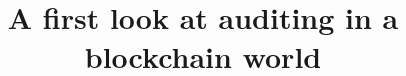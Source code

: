 \documentclass[envcountsect]{llncs}
\begin{document}
\frontmatter
\mainmatter

\title{\Large \bf A first look at auditing in a blockchain world}
\author{}
\institute{}
%

\maketitle












\clearpage
\appendix
\end{document}

